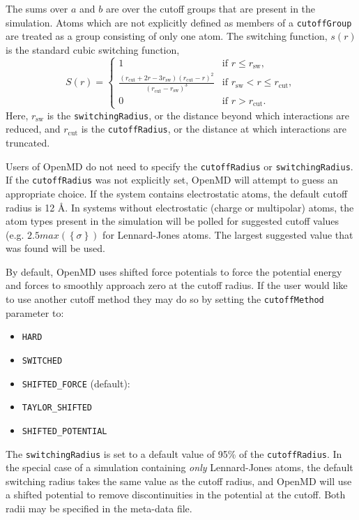 \documentclass[]{book}
\begin{document}
The sums over $a$ and $b$ are over the cutoff groups that are present
in the simulation.  Atoms which are not explicitly defined as members
of a {\tt cutoffGroup} are treated as a group consisting of only one
atom.  The switching function, $s(r)$ is the standard cubic switching
function,
\begin{equation}
S(r) = 
	\begin{cases}
	1 & \text{if $r \le r_{\text{sw}}$},\\
	\frac{(r_{\text{cut}} + 2r - 3r_{\text{sw}})(r_{\text{cut}} - r)^2}
	{(r_{\text{cut}} - r_{\text{sw}})^3} 
	& \text{if $r_{\text{sw}} < r \le r_{\text{cut}}$}, \\
	0 & \text{if $r > r_{\text{cut}}$.}
	\end{cases}
\label{eq:dipoleSwitching}
\end{equation}
Here, $r_{\text{sw}}$ is the {\tt switchingRadius}, or the distance
beyond which interactions are reduced, and $r_{\text{cut}}$ is the
{\tt cutoffRadius}, or the distance at which interactions are
truncated.  

Users of {\sc OpenMD} do not need to specify the {\tt cutoffRadius} or
{\tt switchingRadius}.   
If the {\tt cutoffRadius} was not explicitly set, OpenMD will attempt
to guess an appropriate choice.  If the system contains electrostatic
atoms, the default cutoff radius is 12 \AA.  In systems without
electrostatic (charge or multipolar) atoms, the atom types present in the simulation will be
polled for suggested cutoff values (e.g. $2.5 max(\left\{ \sigma
  \right\})$ for Lennard-Jones atoms.   The largest suggested value
that was found will be used.

By default, OpenMD uses shifted force potentials to force the
potential energy and forces to smoothly approach zero at the cutoff
radius.  If the user would like to use another cutoff method
they may do so by setting the {\tt cutoffMethod} parameter to:
\begin{itemize}
\item {\tt HARD}
\item {\tt SWITCHED}
\item {\tt SHIFTED\_FORCE} (default):
\item {\tt TAYLOR\_SHIFTED}
\item {\tt SHIFTED\_POTENTIAL}
\end{itemize}

The {\tt switchingRadius} is set to a default value of 95\% of the
{\tt cutoffRadius}.  In the special case of a simulation containing
{\it only} Lennard-Jones atoms, the default switching radius takes the
same value as the cutoff radius, and {\sc OpenMD} will use a shifted
potential to remove discontinuities in the potential at the cutoff.
Both radii may be specified in the meta-data file.
\end{document}
